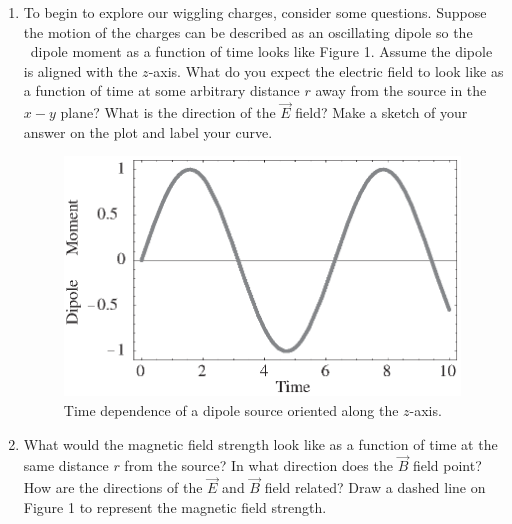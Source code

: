 \begin{enumerate}

\item To begin to explore our wiggling charges, consider some questions.
Suppose the motion of the charges can be described as an oscillating dipole so the \
dipole moment as a function of time looks like Figure 1.
Assume the dipole is aligned with the $z$-axis.
What do you expect the electric field to look like as a function of time 
at some arbitrary distance $r$
away from the source in the $x-y$ plane?
What is the direction of the $\vec E$ field?
Make a sketch of your answer on the plot and label your curve.
\begin{figure}[hbt]
\hspace{0.375in}\includegraphics[height=2.5in]{induction1/fig1_bw.eps}
\caption{Time dependence of a dipole source oriented along the $z$-axis.}
\end{figure}


\item What would the magnetic field strength look like as a function of time at the same 
distance $r$ from the source?
In what direction does the $\vec B$ field point?
How are the directions of the $\vec E$ and $\vec B$ field related?
Draw a dashed line on Figure 1 to represent the magnetic field strength.
\vspace{2.0cm}

\end{enumerate}
